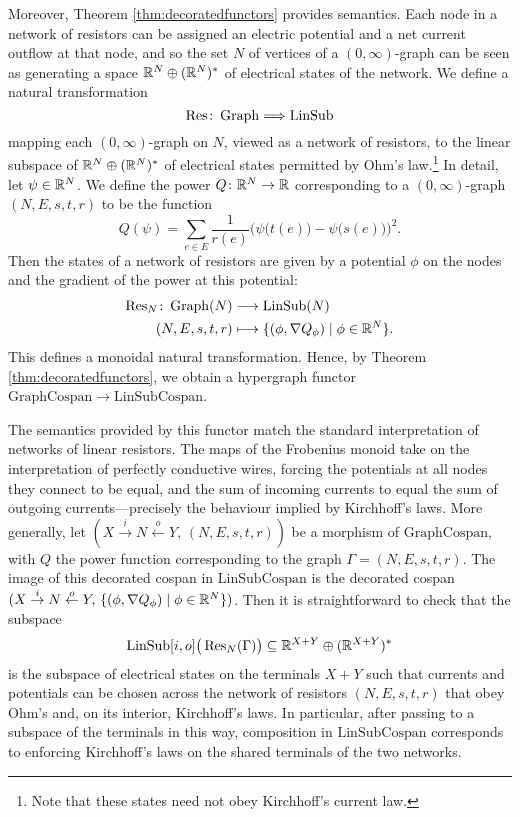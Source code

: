 Moreover, Theorem \ref{thm:decoratedfunctors} provides semantics. Each node in a
network of resistors can be assigned an electric potential and a net current
outflow at that node, and so the set $N$ of vertices of a $(0,\infty)$-graph can
be seen as generating a space ${\mathbb{R}}^N \oplus ({\mathbb{R}}^N)^\ast$ of electrical states of
the network. We define a natural transformation 
\[
  \operatorname{Res}\colon  \operatorname{Graph} \Longrightarrow \operatorname{LinSub}
\]
mapping each $(0,\infty)$-graph on $N$, viewed as a network of resistors, to the
linear subspace of ${\mathbb{R}}^N \oplus ({\mathbb{R}}^N)^\ast$ of electrical states permitted by
Ohm's law.\footnote{Note that these states need not obey Kirchhoff's current
law.} In detail, let $\psi \in {\mathbb{R}}^N$. We define the power $Q\colon  {\mathbb{R}}^N \to {\mathbb{R}}$
corresponding to a $(0,\infty)$-graph $(N,E,s,t,r)$ to be the function
\[
  Q(\psi) = \sum_{e \in E} \frac1{r(e)}
  \Big(\psi\big(t(e)\big)-\psi\big(s(e)\big)\Big)^2.
\]
Then the states of a network of resistors are given by a potential $\phi$ on the
nodes and the gradient of the power at this potential:
\begin{align*}
  \operatorname{Res}_N\colon  \operatorname{Graph}(N) &\longrightarrow \operatorname{LinSub}(N)\\
  (N,E,s,t,r) &\longmapsto \{(\phi,\nabla Q_\phi) \mid \phi \in {\mathbb{R}}^N\}.
\end{align*}
This defines a monoidal natural transformation. Hence, by Theorem
\ref{thm:decoratedfunctors}, we obtain a hypergraph functor
$\mathrm{GraphCospan} \to \mathrm{LinSubCospan}$. 

The semantics provided by this functor match the standard interpretation of
networks of linear resistors. The maps of the Frobenius monoid take on the
interpretation of perfectly conductive wires, forcing the potentials at all
nodes they connect to be equal, and the sum of incoming currents to equal the
sum of outgoing currents---precisely the behaviour implied by Kirchhoff's laws.
More generally, let $(X \stackrel{i}{\rightarrow} N
\stackrel{o}{\leftarrow} Y, \, (N,E,s,t,r))$ be a morphism of
$\mathrm{GraphCospan}$, with $Q$ the power function corresponding to the graph
$\Gamma = (N,E,s,t,r)$. The image of this decorated cospan in
$\mathrm{LinSubCospan}$ is the decorated cospan $(X \stackrel{i}{\rightarrow} N
\stackrel{o}{\leftarrow} Y, \, \{(\phi,\nabla Q_\phi) \mid \phi \in {\mathbb{R}}^N\})$.
Then it is straightforward to check that the subspace 
\[
  \operatorname{LinSub}[i,o]\big(\operatorname{Res}_N(\Gamma)\big)\subseteq {\mathbb{R}}^{X+Y} \oplus ({\mathbb{R}}^{X+Y})^\ast
\]
is the subspace of electrical states on the terminals $X+Y$ such that currents
and potentials can be chosen across the network of resistors $(N,E,s,t,r)$ that
obey Ohm's and, on its interior, Kirchhoff's laws. In particular, after passing
to a subspace of the terminals in this way, composition in
$\mathrm{LinSubCospan}$ corresponds to enforcing Kirchhoff's laws on the shared
terminals of the two networks. 

